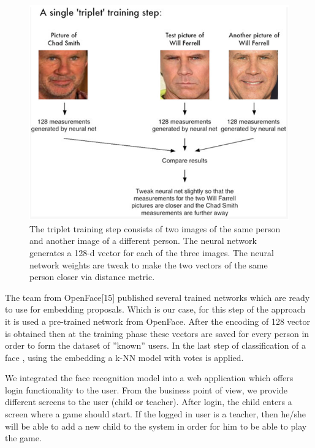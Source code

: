 \documentclass[runningheads,a4paper,11pt]{report}
\begin{document}
    \begin{figure}[!htb]
        \centering
        \includegraphics[scale=0.6]{Figures/img3.png}
        \caption{ The triplet training step consists of two images of the same person and another image of a different person. The neural network generates a 128-d vector for each of the three images. The neural network weights are tweak to make the two vectors of the same person closer via distance metric.\cite{binotuopencv}}
        \label{img3}
    \end{figure}

    The team from OpenFace[15] published several trained networks which are ready to use for embedding proposals. Which is our case, for this step of the approach it is used a pre-trained network from OpenFace.
    After the encoding of 128 vector is obtained then at the training phase these vectors are saved for every person in order to form the dataset of ''known'' users.
    In the last step of classification of a face , using the embedding a k-NN model with votes is applied.

    We integrated the face recognition model into a web application which offers login functionality to the user. From the business point of view, we provide different screens to the user (child or teacher). After login, the child enters a screen where a game should start. If the logged in user is a teacher, then he/she will be able to add a new child to the system in order for him to be able to play the game.
\end{document}
